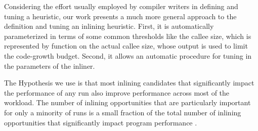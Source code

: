 Considering the effort usually employed by compiler writers in defining
and tuning a heuristic, our work presents a much more general approach
to the definition and tuning an inlining heuristic. First, it is
automatically parameterized in terms of some common thresholds like the
callee size, which is represented by function on the actual callee size,
whose output is used to limit the code-growth budget. Second, it allows
an automatic procedure for tuning in the parameters of the inliner.

The Hypothesis we use is that most inlining candidates that significantly
impact the performance of any run also improve performance across
most of the workload.  The number of inlining opportunities that are
particularly important for only a minority of runs is a small
fraction of the total number of inlining opportunities that
significantly impact program performance \cite{BerubePhD}.
